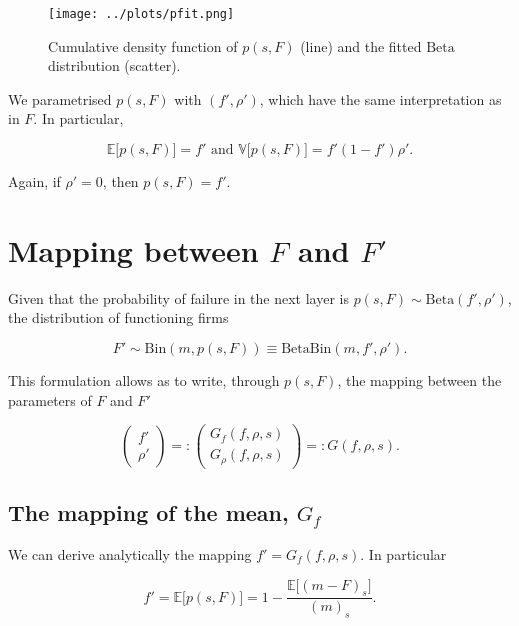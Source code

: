\documentclass[american, abstract=on]{scrartcl}
\theoremstyle{plain}
\newcommand{\E}{\mathbb{E}}
\newcommand{\V}{\mathbb{V}}
\newcommand{\Beta}{\text{Beta}}
\newcommand{\Bin}{\text{Bin}}
\begin{document}
\begin{figure}[H]
    \centering
    \texttt{[image: ../plots/pfit.png]}
    \caption{Cumulative density function of $p(s, F)$ (line) and the fitted $\Beta$ distribution (scatter).}
    \label{fig:pfit}
\end{figure}

We parametrised $p(s, F)$ with $(f', \rho')$, which have the same interpretation as in $F$. In particular,

\begin{equation}
    \E\big[p(s, F)\big] = f' \text{ and } \V\big[p(s, F)\big] = f' (1 - f')\rho'.
\end{equation}

Again, if $\rho' = 0$, then $p(s, F) = f'$.

\section{Mapping between $F$ and $F'$}

Given that the probability of failure in the next layer is $p(s, F) \sim \Beta(f', \rho')$, the distribution of functioning firms 

\begin{equation}
    F' \sim \Bin(m, p(s, F)) \equiv \Beta\Bin(m, f', \rho').
\end{equation}

This formulation allows as to write, through $p(s, F)$, the mapping between the parameters of $F$ and $F'$

\begin{equation}
    \begin{pmatrix}
        f' \\ \rho'
    \end{pmatrix} =: \begin{pmatrix}
        G_f(f, \rho, s) \\ G_\rho(f, \rho, s)
    \end{pmatrix} =: G(f, \rho, s).
\end{equation}

\subsection{The mapping of the mean, $G_f$}

We can derive analytically the mapping $f' = G_f(f, \rho, s)$. In particular

\begin{equation}
    f' = \E\big[p(s, F)\big] = 1 - \frac{\E\big[(m - F)_s\big]}{(m)_s}.
\end{equation}
\end{document}
